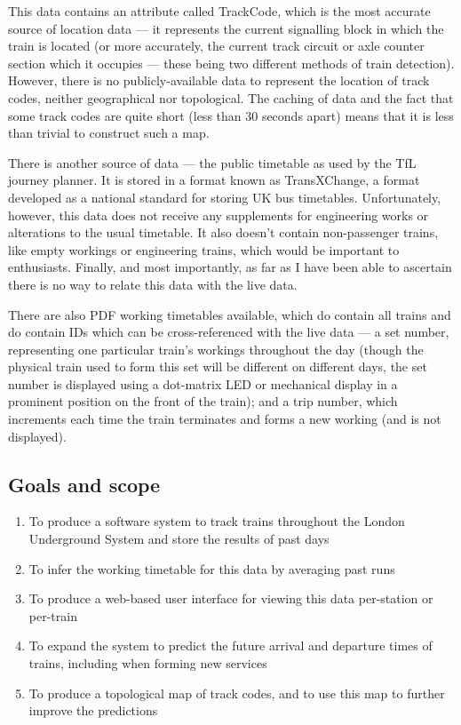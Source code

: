 \documentclass[a4paper,12pt]{article}
\begin{document}
This data contains an attribute called TrackCode, which is the most accurate
source of location data --- it represents the current signalling block in which
the train is located (or more accurately, the current track circuit or axle
counter section which it occupies --- these being two different methods of train
detection). However, there is no publicly-available data to represent the
location of track codes, neither geographical nor topological. The caching of
data and the fact that some track codes are quite short (less than 30 seconds
apart) means that it is less than trivial to construct such a map.

There is another source of data --- the public timetable as used by the TfL
journey planner. It is stored in a format known as TransXChange, a format
developed as a national standard for storing UK bus
timetables\cite{TransXChangeSpec}. Unfortunately, however, this data does not
receive any supplements for engineering works or alterations to the usual
timetable. It also doesn't contain non-passenger trains, like empty workings or
engineering trains, which would be important to enthusiasts. Finally, and most
importantly, as far as I have been able to ascertain there is no way to relate
this data with the live data.

There are also PDF working timetables available\cite{TfLWTT}, which do contain
all trains and do contain IDs which can be cross-referenced with the live data
--- a set number, representing one particular train's workings throughout the
day (though the physical train used to form this set will be different on
different days, the set number is displayed using a dot-matrix LED or
mechanical display in a prominent position on the front of the train); and a
trip number, which increments each time the train terminates and forms a new
working (and is not displayed).

\subsection{Goals and scope}

\begin{enumerate}
  \item To produce a software system to track trains throughout the London
    Underground System and store the results of past days
  \item To infer the working timetable for this data by averaging past runs
  \item To produce a web-based user interface for viewing this data per-station
    or per-train
  \item To expand the system to predict the future arrival and departure times
    of trains, including when forming new services
  \item To produce a topological map of track codes, and to use this map to
    further improve the predictions
\end{enumerate}
\end{document}
